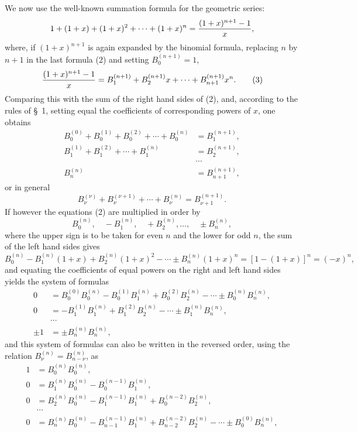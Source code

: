 \documentclass[11pt]{article}
\begin{document}
We now use the well-known summation formula for the geometric series:
\[
1+(1+x)+(1+x)^2+\cdots+(1+x)^n={(1+x)^{n+1}-1\over x},
\]
where, if $(1+x)^{n+1}$ is again expanded by the binomial formula, replacing $n$ by $n+1$ in the last formula (2) and setting $B_0^{(n+1)}=1$,
\begin{equation}
{(1+x)^{n+1}-1\over x}=B_1^{(n+1)}+B_2^{(n+1)}x+\cdots+B_{n+1}^{(n+1)}x^n.
\tag{3}
\end{equation}
Comparing this with the sum of the right hand sides of (2), and, according to the rules of \S~1, setting equal the coefficients of corresponding powers of $x$, one obtains
\begin{equation}
\begin{aligned}
 B_0^{(0)}+B_0^{(1)}+B_0^{(2)}+\cdots+B_0^{(n)}&=B_1^{(n+1)},\\
 B_1^{(1)}+B_1^{(2)}+\cdots+B_1^{(n)}&=B_2^{(n+1)},\\
&\cdots\\
 B_n^{(n)}&=B_{n+1}^{(n+1)},
\end{aligned}
\tag{4}
\end{equation}
or in general
\begin{equation}
 B_\nu^{(\nu)}+B_\nu^{(\nu+1)}+\cdots+B_\nu^{(n)}=B_{\nu+1}^{(n+1)}.
\tag{5}
\end{equation}
If however the equations (2) are multiplied in order by
\[
 B_0^{(n)},
 \quad -B_1^{(n)},
 \quad +B_2^{(n)},
 \ldots,
 \quad \pm B_n^{(n)},
\]
where the upper sign is to be taken for even $n$ and the lower for odd $n$, the sum of the left hand sides gives
\[
B_0^{(n)}-B_1^{(n)}(1+x)+B_2^{(n)}(1+x)^2-\cdots\pm B_n^{(n)}(1+x)^n=[1-(1+x)]^n=(-x)^n,
\]
and equating the coefficients of equal powers on the right and left hand sides yields the system of formulas
\begin{equation}
\begin{aligned}
0&=B_0^{(0)}B_0^{(n)}-B_0^{(1)}B_1^{(n)}+B_0^{(2)}B_2^{(n)}-\cdots\pm B_0^{(n)}B_n^{(n)},\\
0&=-B_1^{(1)}B_1^{(n)}+B_1^{(2)}B_2^{(n)}-\cdots\pm B_1^{(n)}B_n^{(n)},\\
&\cdots\\
\pm 1&=\pm B_n^{(n)}B_n^{(n)},
\end{aligned}
\tag{6}
\end{equation}
and this system of formulas can also be written in the reversed order, using the relation $B_\nu^{(n)}=B_{n-\nu}^{(n)}$, as
\begin{equation}
\begin{aligned}
1&=B_0^{(n)}B_0^{(n)},\\
0&=B_1^{(n)}B_0^{(n)}-B_0^{(n-1)}B_1^{(n)},\\
0&=B_2^{(n)}B_0^{(n)}-B_1^{(n-1)}B_1^{(n)}+B_0^{(n-2)}B_2^{(n)},\\
&\cdots\\
0&=B_n^{(n)}B_0^{(n)}-B_{n-1}^{(n-1)}B_1^{(n)}+B_{n-2}^{(n-2)}B_2^{(n)}-\cdots\pm B_0^{(0)}B_n^{(n)},
\end{aligned}
\tag{7}
\end{equation}
\end{document}
